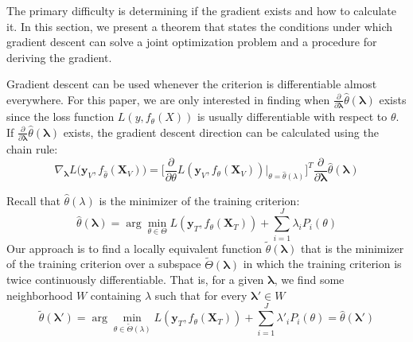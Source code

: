 \documentclass[10pt,letterpaper]{article}
\begin{document}
\begin{center}
\end{center}
The primary difficulty is determining if the gradient exists and how to calculate it. In this section, we present a theorem that states the conditions under which gradient descent can solve a joint optimization problem and a procedure for deriving the gradient.

Gradient descent can be used whenever the criterion is differentiable almost everywhere. For this paper, we are only interested in finding when $\frac{\partial}{\partial \boldsymbol{\lambda}} \hat{\theta}(\boldsymbol{\lambda})$ exists since the loss function $L(y, f_\theta(X))$ is usually differentiable with respect to $\theta$. If $\frac{\partial}{\partial \boldsymbol{\lambda}} \hat{\theta}(\boldsymbol{\lambda})$ exists, the gradient descent direction can be calculated using the chain rule:
\begin{equation}
\nabla_{\boldsymbol{\lambda}} L \Big( \boldsymbol{y}_V, f_{\hat{\theta}}(\boldsymbol{X}_V) \Big ) = 
\Big [\frac{\partial}{\partial \theta} L ( \boldsymbol{y}_V, f_{\theta}(\boldsymbol{X}_V)) \Big |_{\theta=\hat{\theta}(\lambda)} \Big ]^T 
\frac{\partial}{\partial \boldsymbol{\lambda}} \hat{\theta}(\boldsymbol{\lambda})
\label{chainrule}
\end{equation}


Recall that $\hat \theta(\lambda)$ is the minimizer of the training criterion:
\begin{equation}
\hat{\theta}(\boldsymbol{\lambda}) = \arg \min_{\theta \in \Theta} L(\boldsymbol{y}_T, f_\theta (\boldsymbol{X}_T)) + \sum\limits_{i=1}^J \lambda_i P_i(\theta)
\label{inneroptproblem}
\end{equation}
Our approach is to find a locally equivalent function $\tilde{\theta}(\boldsymbol{\lambda})$ that is the minimizer of the training criterion over a subspace $\tilde \Theta(\boldsymbol{\lambda})$ in which the training criterion is twice continuously differentiable. That is, for a given $\boldsymbol{\lambda}$, we find some neighborhood $W$ containing $\lambda$ such that for every $\boldsymbol{\lambda}' \in W$
\begin{equation}
\tilde{\theta}(\boldsymbol{\lambda}') = \arg \min_{\theta \in \tilde\Theta(\lambda)} L(\boldsymbol{y}_T, f_\theta (\boldsymbol{X}_T)) + \sum\limits_{i=1}^J \lambda'_i P_i(\theta) = \hat{\theta}(\boldsymbol{\lambda}')
\end{equation}
\end{document}
